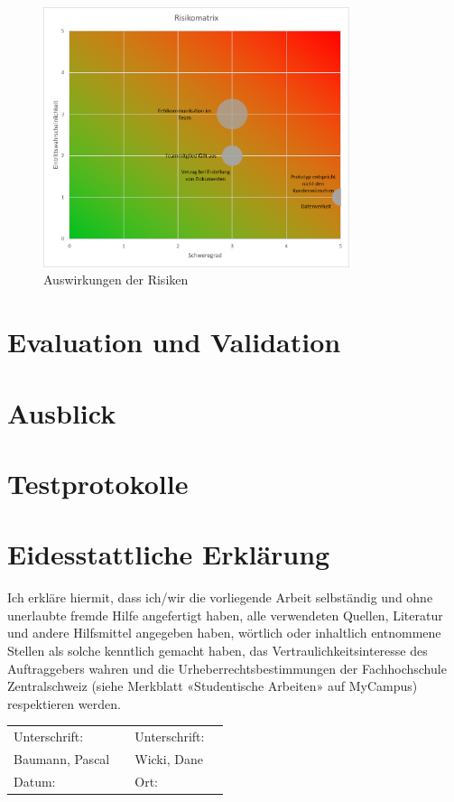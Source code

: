 \documentclass[a4paper]{scrreprt}
\begin{document}
\vspace{1em}

\begin{figure}[h!]
	\centering
	\includegraphics[keepaspectratio, width=0.8\textwidth]{RisikoMatrix}
	\caption{Auswirkungen der Risiken}
\end{figure}

\chapter{Evaluation und Validation}


\chapter{Ausblick}

\appendix

\chapter{Testprotokolle}



\listoffigures

\listoftables

\listofmyequations \pagebreak

\printbibliography

\chapter*{Eidesstattliche Erklärung}
Ich erkläre hiermit, dass ich/wir die vorliegende Arbeit selbständig und ohne unerlaubte fremde Hilfe angefertigt haben, alle verwendeten Quellen, Literatur und andere Hilfsmittel angegeben haben, wörtlich oder inhaltlich entnommene Stellen als solche kenntlich gemacht haben, das Vertraulichkeitsinteresse des Auftraggebers wahren und die Urheberrechtsbestimmungen der Fachhochschule Zentralschweiz (siehe Merkblatt «Studentische Arbeiten» auf MyCampus) respektieren werden.

\vspace{1em}

\renewcommand{\arraystretch}{2}
\begin{tabularx}{\textwidth}{XXXX}
	Unterschrift: & & Unterschrift: & \\ \cline{2-2}\cline{4-4}
	Baumann, Pascal & & Wicki, Dane & \\
	Datum: & & Ort: & \\
\end{tabularx}
\end{document}
